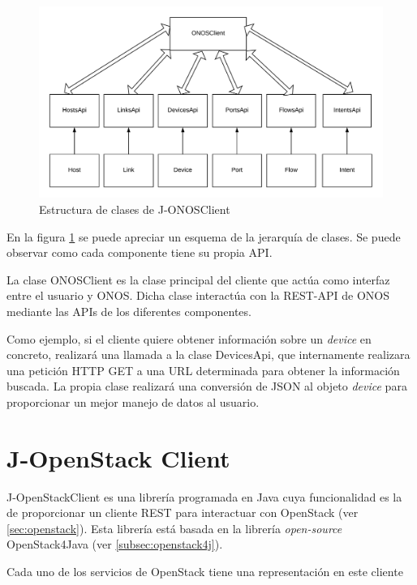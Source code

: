 \begin{figure}[!ht]
	\centering
	\includegraphics[width=1\linewidth]{imagenes/ONOSClient}
	\caption{Estructura de clases de J-ONOSClient}
	\label{fig:onosclient}
\end{figure}

En la figura \ref{fig:onosclient} se puede apreciar un esquema de la jerarquía de clases. Se puede observar como cada componente tiene su propia \ac{API}.

La clase ONOSClient es la clase principal del cliente que actúa como interfaz entre el usuario y \ac{ONOS}. Dicha clase interactúa con la \ac{REST}-\ac{API} de \ac{ONOS} mediante las \acp{API} de los diferentes componentes.

Como ejemplo, si el cliente quiere obtener información sobre un \textit{device} en concreto, realizará una llamada a la clase DevicesApi, que internamente realizara una petición \ac{HTTP} GET a una \ac{URL} determinada para obtener la información buscada. La propia clase realizará una conversión de \ac{JSON} al objeto \textit{device} para proporcionar un mejor manejo de datos al usuario.


\section{J-OpenStack Client}
\label{sec:openstackclient}

J-OpenStackClient\cite{openstack4jjavadocbib} es una librería programada en Java cuya funcionalidad es la de proporcionar un cliente \ac{REST} para interactuar con OpenStack (ver \ref{sec:openstack}). Esta librería está basada en la librería \textit{open-source} OpenStack4Java (ver \ref{subsec:openstack4j}).

Cada uno de los servicios de OpenStack tiene una representación en este cliente


